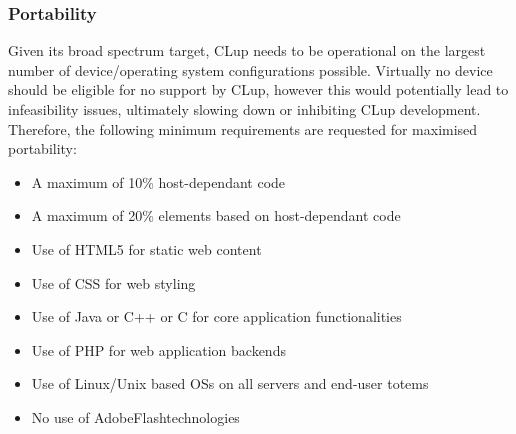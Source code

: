 \subsubsection{Portability}
Given its broad spectrum target, CLup needs to be operational on the largest number of device/operating system configurations possible. Virtually no device should be eligible for no support by CLup, however this would potentially lead to infeasibility issues, ultimately slowing down or inhibiting CLup development. \newline
Therefore, the following minimum requirements are requested for maximised portability:\newline
\begin{itemize}
    \item A maximum of 10\% host-dependant code
    \item A maximum of 20\% elements based on host-dependant code
    \item Use of HTML5 for static web content
    \item Use of CSS for web styling
    \item Use of Java or C++ or C for core application functionalities
    \item Use of PHP for web application backends
    \item Use of Linux/Unix based OSs on all servers and end-user totems
    \item No use of Adobe\textregistered \space Flash\textregistered \space technologies
\end{itemize}

